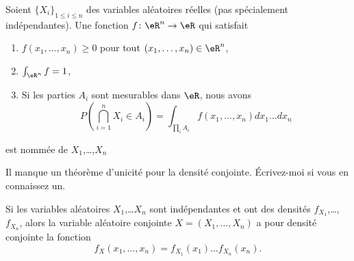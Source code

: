 \begin{definition}      \label{DefFonrepConj}
	Soient \( \{ X_i \}_{1\leq i\leq n}\) des variables aléatoires réelles (pas spécialement indépendantes). Une fonction \( f\colon \eR^n\to \eR\) qui satisfait
	\begin{enumerate}
		\item
		      \( f(x_1,\ldots,x_n)\geq 0\) pour tout \( (x_1,\ldots,x_n)\in\eR^n\),
		\item
		      \( \int_{\eR^n}f=1\),
		\item       \label{ItemDefFonrepConjiii}
		      Si les parties \( A_i\) sont mesurables dans \( \eR\), nous avons
		      \begin{equation}
			      P(\bigcap_{i=1}^n X_i\in A_i)=\int_{\prod_i A_i}f(x_1,\ldots,x_n)dx_1\ldots dx_n
		      \end{equation}
	\end{enumerate}
	est nommée  de \( X_1\),\ldots,\( X_n\)
\end{definition}

\begin{probleme}		\label{PROBooPVIXooNLpmIn}
	Il manque un théorème d'unicité pour la densité conjointe. Écrivez-moi si vous en connaissez un.
\end{probleme}

\begin{proposition}     \label{PropDensiteConjIndep}
	Si les variables aléatoires \( X_1\),\ldots \( X_n\) sont indépendantes et ont des densités \( f_{X_1}\),\ldots,\( f_{X_n}\), alors la variable aléatoire conjointe \( X=(X_1,\ldots,X_n)\) a pour densité conjointe la fonction
	\begin{equation}
		f_X(x_1,\ldots,x_n)=f_{X_1}(x_1)\ldots f_{X_n}(x_n).
	\end{equation}
\end{proposition}

